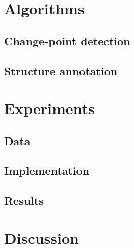 \documentclass{article}
\begin{document}
\section{Algorithms}

\subsection{Change-point detection}

\subsection{Structure annotation}

\section{Experiments}

\subsection{Data}

\subsection{Implementation}

\subsection{Results}

\section{Discussion}


\end{document}
